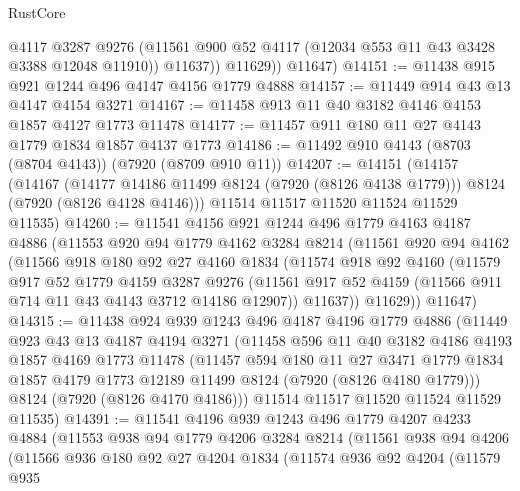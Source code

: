 \begin{lexlean}{RustCore}
\begin{coremodule}
              @4117
              @3287
              @9276
              (@11561 @900 @52 @4117 (@12034 @553 @11 @43 @3428 @3388 @12048 @11910))
              @11637))
          @11629))
      @11647)
@14151 := @11438 @915 @921 @1244 @496 @4147 @4156 @1779 @4888
@14157 := @11449 @914 @43 @13 @4147 @4154 @3271
@14167 := @11458 @913 @11 @40 @3182 @4146 @4153 @1857 @4127 @1773 @11478
@14177 := @11457 @911 @180 @11 @27 @4143 @1779 @1834 @1857 @4137 @1773
@14186 := @11492 @910 @4143 (@8703 (@8704 @4143)) (@7920 (@8709 @910 @11))
@14207 := @14151
    (@14157
      (@14167
        (@14177 @14186 @11499 @8124 (@7920 (@8126 @4138 @1779)))
        @8124
        (@7920 (@8126 @4128 @4146)))
      @11514
      @11517
      @11520
      @11524
      @11529
      @11535)
@14260 := @11541
    @4156
    @921
    @1244
    @496
    @1779
    @4163
    @4187
    @4886
    (@11553
      @920
      @94
      @1779
      @4162
      @3284
      @8214
      (@11561
        @920
        @94
        @4162
        (@11566
          @918
          @180
          @92
          @27
          @4160
          @1834
          (@11574
            @918
            @92
            @4160
            (@11579
              @917
              @52
              @1779
              @4159
              @3287
              @9276
              (@11561 @917 @52 @4159 (@11566 @911 @714 @11 @43 @4143 @3712 @14186 @12907))
              @11637))
          @11629))
      @11647)
@14315 := @11438
    @924
    @939
    @1243
    @496
    @4187
    @4196
    @1779
    @4886
    (@11449
      @923
      @43
      @13
      @4187
      @4194
      @3271
      (@11458
        @596
        @11
        @40
        @3182
        @4186
        @4193
        @1857
        @4169
        @1773
        @11478
        (@11457
          @594
          @180
          @11
          @27
          @3471
          @1779
          @1834
          @1857
          @4179
          @1773
          @12189
          @11499
          @8124
          (@7920 (@8126 @4180 @1779)))
        @8124
        (@7920 (@8126 @4170 @4186)))
      @11514
      @11517
      @11520
      @11524
      @11529
      @11535)
@14391 := @11541
    @4196
    @939
    @1243
    @496
    @1779
    @4207
    @4233
    @4884
    (@11553
      @938
      @94
      @1779
      @4206
      @3284
      @8214
      (@11561
        @938
        @94
        @4206
        (@11566
          @936
          @180
          @92
          @27
          @4204
          @1834
          (@11574
            @936
            @92
            @4204
            (@11579
              @935

\end{coremodule}
\end{lexlean}
